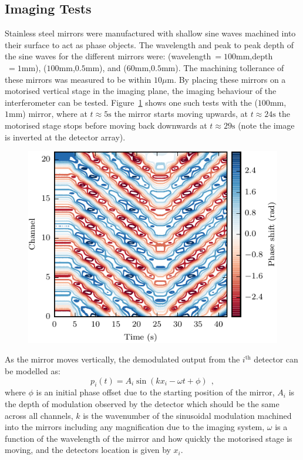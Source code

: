 \subsection{Imaging Tests}
Stainless steel mirrors were manufactured with shallow sine waves machined into their surface to act as phase objects.
The wavelength and peak to peak depth of the sine waves for the different mirrors were: (wavelength$~=100\mathrm{mm}$,depth$~=1\mathrm{mm}$), ($100\mathrm{mm}$,$0.5\mathrm{mm}$), and ($60\mathrm{mm}$,$0.5\mathrm{mm}$).
The machining tollerance of these mirrors was measured to be within $10\mu\mathrm{m}$.
By placing these mirrors on a motorised vertical stage in the imaging plane, the imaging behaviour of the interferometer can be tested.
Figure~\ref{fig:moving_mirror_contour} shows one such tests with the ($100\mathrm{mm}$,$1\mathrm{mm}$) mirror, where at $t\approx5\mathrm{s}$ the mirror starts moving upwards, at $t\approx24\mathrm{s}$ the motorised stage stops before moving back downwards at $t\approx29\mathrm{s}$ (note the image is inverted at the detector array).

\begin{figure}[!h]
\begin{center}
\includegraphics[]{figures/shot-85368-wavelength-100-depth-1-00pi-contour.pdf}
\end{center}
\caption{}
\label{fig:moving_mirror_contour}
\end{figure}

As the mirror moves vertically, the demodulated output from the $i^{\mathrm{th}}$ detector can be modelled as:
\begin{equation}
\label{eqn:wobbly_mirror_fit}
p_i(t) = A_i \sin(k x_i - \omega t + \phi)~~,
\end{equation}
where $\phi$ is an initial phase offset due to the starting position of the mirror, $A_i$ is the depth of modulation observed by the detector which should be the same across all channels, $k$ is the wavenumber of the sinusoidal modulation machined into the mirrors including any magnification due to the imaging system, $\omega$ is a function of the wavelength of the mirror and how quickly the motorised stage is moving, and the detectors location is given by $x_i$.

